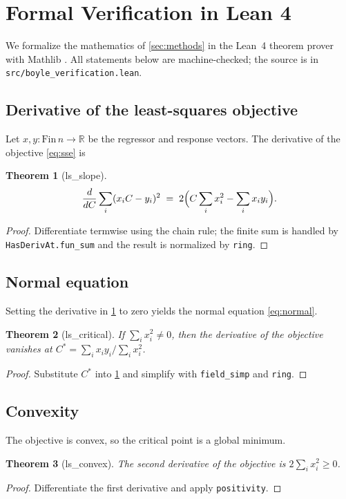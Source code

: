 \documentclass{article}
\theoremstyle{plain}
\newtheorem{theorem}{Theorem}[section]
\theoremstyle{definition}
\theoremstyle{remark}
\begin{document}
\section{Formal Verification in Lean 4}
\label{sec:formal}

We formalize the mathematics of \cref{sec:methods} in the Lean~4 theorem
prover with Mathlib \cite{lean2021}. All statements below are machine-checked;
the source is in \texttt{src/boyle\_verification.lean}.

\subsection{Derivative of the least-squares objective}
Let $x, y : \mathrm{Fin}\,n \to \mathbb{R}$ be the regressor and response
vectors. The derivative of the objective \cref{eq:sse} is
\begin{theorem}[ls\_slope]
\label{thm:slope}
\[
  \frac{d}{dC}\sum_{i} (x_i C - y_i)^2
  \;=\; 2\Bigl(C \sum_i x_i^2 - \sum_i x_i y_i\Bigr).
\]
\end{theorem}
\begin{proof}
  Differentiate termwise using the chain rule; the finite sum is handled by
  \texttt{HasDerivAt.fun\_sum} and the result is normalized by \texttt{ring}.
\end{proof}

\subsection{Normal equation}
Setting the derivative in \cref{thm:slope} to zero yields the normal equation
\cref{eq:normal}.
\begin{theorem}[ls\_critical]
\label{thm:critical}
If $\sum_i x_i^2 \neq 0$, then the derivative of the objective vanishes at
$C^* = \sum_i x_i y_i / \sum_i x_i^2$.
\end{theorem}
\begin{proof}
  Substitute $C^*$ into \cref{thm:slope} and simplify with
  \texttt{field\_simp} and \texttt{ring}.
\end{proof}

\subsection{Convexity}
The objective is convex, so the critical point is a global minimum.
\begin{theorem}[ls\_convex]
\label{thm:convex}
The second derivative of the objective is $2\sum_i x_i^2 \ge 0$.
\end{theorem}
\begin{proof}
  Differentiate the first derivative and apply \texttt{positivity}.
\end{proof}
\end{document}
